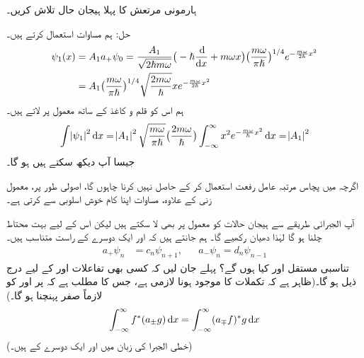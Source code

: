 ہارمونی مرتعش کا پہلا ہیجان حال تلاش کریں۔ 

حل:\quad
 ہم مساوات  استعمال کرتے ہیں۔ 
\begin{gather}
\begin{aligned}\label{مساوات_شروڈنگر_ہارمونی_ہیجان_حالات}
\psi_1 (x) &= A_1 a_+ \psi_0 = \frac{ A_1 }{ \sqrt{ 2 \hslash m \omega } } \big( -\hslash \frac{\dif}{\dif x} + m \omega x\big) \big( \frac{ m \omega}{ \pi \hslash} \big)^{1/4}    e^{-\frac{  m \omega }{ 2 \hslash } x^2}\\
 &= A_1 \big( \frac{ m \omega }{ \pi \hslash}\big)^{1/4} \sqrt{ \frac{ 2 m \omega }{ \hslash} } x e^{-\frac{ m \omega }{ 2 \hslash } x^2}
\end{aligned}
\end{gather}
ہم اس کو قلم و کاغذ کے ساتھ  معمول پر لاتے ہیں۔ 
\begin{align*}
\int \abs{\psi_1}^2 \dif x = \abs{A_1 }^2 \sqrt{ \frac{ m \omega}{ \pi \hslash } } \big( \frac{ 2 m \omega }{ \hslash} \big ) \int_{ - \infty }^{ \infty } x^2  e^{-\frac{ m \omega }{ \hslash } x^2}  \dif x  =  \abs{A_1}^2
\end{align*} 
جیسا آپ دیکھ سکتے ہیں  ہو گا۔
 
اگرچہ میں پچاس مرتبہ عامل رفعت استعمال کر کے   حاصل نہیں کرنا چاہوں گا، اصولی طور پر،   معمول زنی کے علاوہ،  مساوات  اپنا کام خوش اسلوبی سے کرتی ہے۔

  آپ الجبرائی  طریقے سے ہیجان حالات کو معمول پر بھی لا سکتے ہیں لیکن اس کے لیے بہت محتاط چلنا ہو گا لہٰذا دھیان رکھیے  گا۔ ہم جانتے ہیں کہ 
 اور   ایک دوسرے کے راست متناسب ہیں۔ 
\begin{align} 
a_+ \psi_n&= c_n  \psi_{n+1}  , &&  a_- \psi_n = d_n \psi_{n-1}
\end{align} 
 تناسبی مستقل  اور   کیا ہوں گے؟  پہلے  جان لیں کہ کسی بھی تفاعلات  اور  کے لیے درج ذیل ہو گا۔(ظاہر ہے کہ تکملات کا موجود ہونا لازمی ہے، جس کا مطلب ہے کہ  پر  اور  کو لازماً صفر پہنچنا  ہو گا۔)
\begin{align}\label{مساوات_شروڈنگر_سیڑھی_متبادل}
\int_{ - \infty }^{ \infty } f^*( a_{\pm} g ) \dif x = \int_{ - \infty }^{ \infty } ( a_{\mp} f)^* g \dif x
\end{align}
(خطی الجبرا کی زبان میں  اور  ایک دوسرے کے   ہیں۔)

